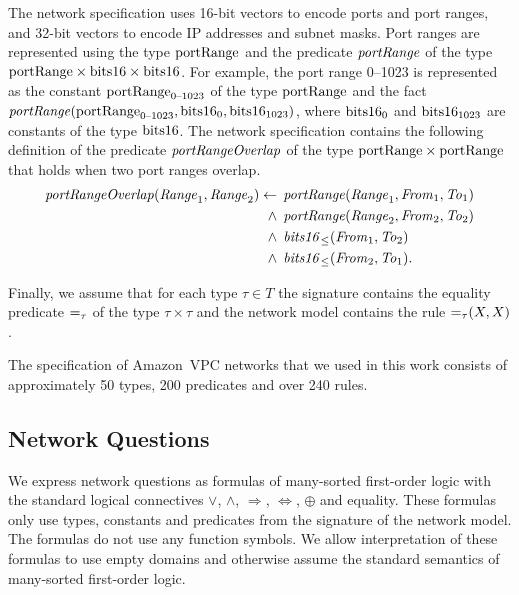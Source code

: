 The network specification uses 16-bit vectors to encode ports and port ranges, and 32-bit vectors to encode IP addresses and subnet masks. Port ranges are represented using the type $\mathrm{portRange}$ and the predicate $\mathit{portRange}$ of the type $\mathrm{portRange}\times\mathrm{bits16}\times\mathrm{bits16}$. For example, the port range 0--1023 is represented as the constant $\mathrm{portRange}_\text{0--1023}$ of the type $\mathrm{portRange}$ and the fact $\mathit{portRange}(\mathrm{portRange}_\text{0--1023},\allowbreak\mathrm{bits16}_0,\allowbreak\mathrm{bits16}_{1023})$, where $\mathrm{bits16}_0$ and $\mathrm{bits16}_{1023}$ are constants of the type $\mathrm{bits16}$. The network specification contains the following definition of the predicate $\mathit{portRangeOverlap}$ of the type $\mathrm{portRange}\times\mathrm{portRange}$ that holds when two port ranges overlap.
\begin{equation*}
  \begin{aligned}
\mathit{portRangeOverlap}(\mathit{Range}_1,\mathit{Range}_2)\leftarrow\:&\:\mathit{portRange}(\mathit{Range}_1,\mathit{From}_1,\mathit{To}_1) \\
  \wedge\:&\:\mathit{portRange}(\mathit{Range}_2,\mathit{From}_2,\mathit{To}_2) \\
  \wedge\:&\:\mathit{bits16}_\le(\mathit{From}_1,\mathit{To}_2) \\
  \wedge\:&\:\mathit{bits16}_\le(\mathit{From}_2,\mathit{To}_1).
  \end{aligned}
\end{equation*}

Finally, we assume that for each type $\tau\in T$ the signature contains the equality predicate $\mathit{=}_\tau$ of the type $\tau\times\tau$ and the network model contains the rule $\mathit{=}_\tau(X,X)$.

The specification of Amazon~VPC networks that we used in this work consists of approximately 50 types, 200 predicates and over 240 rules.


\subsection{Network Questions}
\label{sect:aws/reachability/properties}

We express network questions as formulas of many-sorted first-order logic with the standard logical connectives $\vee$, $\wedge$, $\Rightarrow$, $\Leftrightarrow$, $\oplus$ and equality. These formulas only use types, constants and predicates from the signature of the network model. The formulas do not use any function symbols. We allow interpretation of these formulas to use empty domains and otherwise assume the standard semantics of many-sorted first-order logic.

